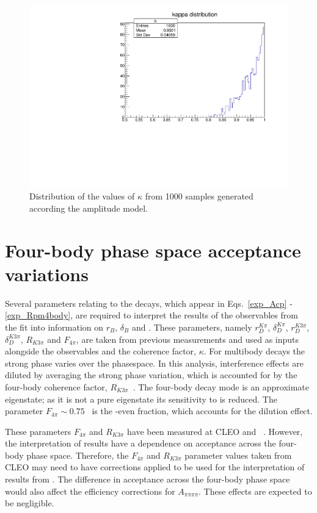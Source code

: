 \begin{figure}[h]
\centering
\includegraphics[trim = 0mm 0mm 0mm 8mm, clip, width=0.5\linewidth]{figures/results/kappa.pdf}
\caption{Distribution of the values of $\kappa$ from 1000 samples generated according the amplitude model.}
\label{kappadistribution}
\end{figure}

\section{Four-body phase space acceptance variations}
\label{sec:interpretation:inputs}

Several parameters relating to the \Dz decays, which appear in Eqs.~\ref{exp_Acp} - \ref{exp_Rpm4body}, are required to interpret the results of the \CP observables from the \CP fit into information on $r_B$, $\delta_B$ and \Pgamma. These parameters, namely $r_D^{K\pi}$, $\delta_D^{K\pi}$, $r_D^{K3\pi}$, $\delta_D^{K3\pi}$, $R_{K3\pi}$ and $F_{4\pi}$, are taken from previous measurements and used as inputs alongside the \CP observables and the coherence factor, $\kappa$. For multibody \decay{\Dz}{\Kmp\pipm\pimp\pipm} decays the strong phase varies over the phasespace. In this analysis, interference effects are diluted by averaging the strong phase variation, which is accounted for by the four-body coherence factor, $R_{K3\pi}$~\cite{charmk3pi,LHCb-PAPER-2015-057}. The four-body \Dz decay mode \decay{\Dz}{\pip\pim\pip\pim} is an approximate \CP eigenstate; as it is not a pure \CP eigenstate its sensitivity to \Pgamma is reduced. The parameter $F_{4\pi} \sim 0.75$~\cite{charm4pi} is the \CP-even fraction, which accounts for the dilution effect.

These parameters $F_{4\pi}$ and $R_{K3\pi}$ have been measured at CLEO and \lhcb~\cite{charmk3pi,LHCb-PAPER-2015-057,charm4pi}. However, the interpretation of \lhcb results have a dependence on \lhcb acceptance across the four-body phase space. Therefore, the $F_{4\pi}$ and $R_{K3\pi}$ parameter values taken from CLEO may need to have corrections applied to be used for the interpretation of results from \lhcb. The difference in \lhcb acceptance across the four-body phase space would also affect the efficiency corrections for $A_{\pi\pi\pi\pi}$. These effects are expected to be negligible.

